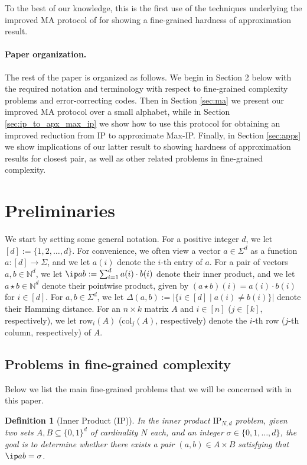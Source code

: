 \documentclass[11pt]{article}
\theoremstyle{plain}
\newtheorem{defn}[thm]{Definition}
\theoremstyle{remark}
\newcommand{\N}{\mathbb{N}}
\newcommand{\IP}{\mathrm{IP}}
\newcommand{\row}{\mathrm{row}}
\newcommand{\col}{\mathrm{col}}
\begin{document}
To the best of our knowledge, this is the first use of the techniques underlying the improved MA protocol of \cite{Che18} for showing a fine-grained hardness of approximation result.

\paragraph{Paper organization.} The rest of the paper is organized as follows. We begin in Section 2 below with the required notation and terminology with respect to fine-grained complexity problems and error-correcting codes. Then in Section \ref{sec:ma} we present our improved MA protocol over a small alphabet, while in Section
\ref{sec:ip_to_apx_max_ip} we show how to use this protocol for obtaining an improved reduction from IP to approximate Max-IP. Finally, in Section \ref{sec:apps} we show implications of our latter result to showing hardness of approximation results for closest pair, as well as other related problems in fine-grained complexity.

\section{Preliminaries}\label{sec:prelim}


We start by setting some general notation.
For a positive integer $d$, we let $[d]:=\{1,2, \ldots, d\}$.  For convenience, we often view a vector $a \in \Sigma^d$ as a function $a:[d] \to \Sigma$, and we let $a(i)$ denote the $i$-th entry of $a$. 
For a pair of vectors $a,b \in \N^d$, we let $\ip a b := \sum_{i=1}^d a(i) \cdot b(i)$ denote their inner product,  and we let $a \star b \in \N^d$ denote their pointwise product, given by $(a \star b)(i) = a(i) \cdot b(i)$ for $i \in [d]$. For $a,b \in \Sigma^d$, we let $\Delta(a,b):=|\{i \in [d] \mid a(i) \neq b(i)\}|$ denote their \textsf{Hamming distance}.
For an $n \times k$ matrix $A$ and $i\in [n]$ ($j \in [k]$, respectively),
we let $\row_i(A)$ ($\col_j(A)$, respectively) denote the $i$-th row ($j$-th column, respectively) of $A$.

\subsection{Problems in fine-grained complexity}

Below we list the main fine-grained problems that we will be concerned with in this paper.


\begin{defn}[Inner Product ($\IP$)] In  the \textsf{ inner product $\IP_{N,d}$ problem},
given two sets $A, B\subseteq\{0,1\}^d$
of cardinality $N$ each, and an integer $\sigma \in \{0,1,\ldots, d\}$, the goal is to determine whether there exists a pair $(a,b)\in A\times B$ satisfying that $\ip a b = \sigma$.
\end{defn}
\end{document}
